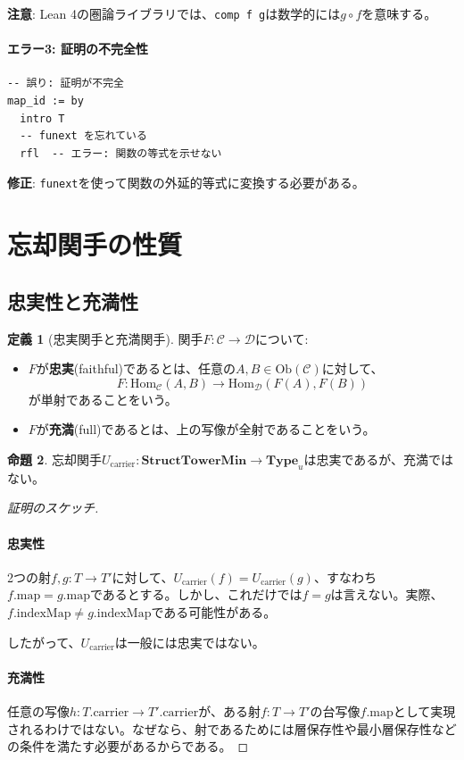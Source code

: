 \documentclass[a4paper,12pt]{article}
\theoremstyle{definition}
\newtheorem{definition}{定義}[section]
\newtheorem{proposition}[definition]{命題}
\begin{document}
\textbf{注意}: Lean 4の圏論ライブラリでは、\texttt{comp f g}は数学的には$g \circ f$を意味する。

\paragraph{エラー3: 証明の不完全性}
\begin{lstlisting}[style=leanstyle, language=ML]
-- 誤り: 証明が不完全
map_id := by
  intro T
  -- funext を忘れている
  rfl  -- エラー: 関数の等式を示せない
\end{lstlisting}

\textbf{修正}: \texttt{funext}を使って関数の外延的等式に変換する必要がある。

\section{忘却関手の性質}

\subsection{忠実性と充満性}

\begin{definition}[忠実関手と充満関手]
関手$F : \mathcal{C} \to \mathcal{D}$について:
\begin{itemize}
\item $F$が\textbf{忠実}(faithful)であるとは、任意の$A, B \in \text{Ob}(\mathcal{C})$に対して、
\[
F : \text{Hom}_{\mathcal{C}}(A, B) \to \text{Hom}_{\mathcal{D}}(F(A), F(B))
\]
が単射であることをいう。
\item $F$が\textbf{充満}(full)であるとは、上の写像が全射であることをいう。
\end{itemize}
\end{definition}

\begin{proposition}
忘却関手$U_{\text{carrier}} : \mathbf{StructTowerMin} \to \mathbf{Type}_u$は忠実であるが、充満ではない。
\end{proposition}

\begin{proof}[証明のスケッチ]
\paragraph{忠実性}
2つの射$f, g : T \to T'$に対して、$U_{\text{carrier}}(f) = U_{\text{carrier}}(g)$、すなわち$f.\text{map} = g.\text{map}$であるとする。しかし、これだけでは$f = g$は言えない。実際、$f.\text{indexMap} \neq g.\text{indexMap}$である可能性がある。

したがって、$U_{\text{carrier}}$は一般には忠実ではない。

\paragraph{充満性}
任意の写像$h : T.\text{carrier} \to T'.\text{carrier}$が、ある射$f : T \to T'$の台写像$f.\text{map}$として実現されるわけではない。なぜなら、射であるためには層保存性や最小層保存性などの条件を満たす必要があるからである。
\end{proof}
\end{document}
